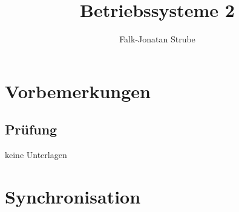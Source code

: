 \documentclass{scrreprt}
\title{Betriebssysteme 2}
\author{Falk-Jonatan Strube}
\begin{document}
\maketitle
\newpage
\tableofcontents
\newpage

\chapter*{Vorbemerkungen}

\section*{Prüfung}
keine Unterlagen

\chapter{Synchronisation}


\end{document}
